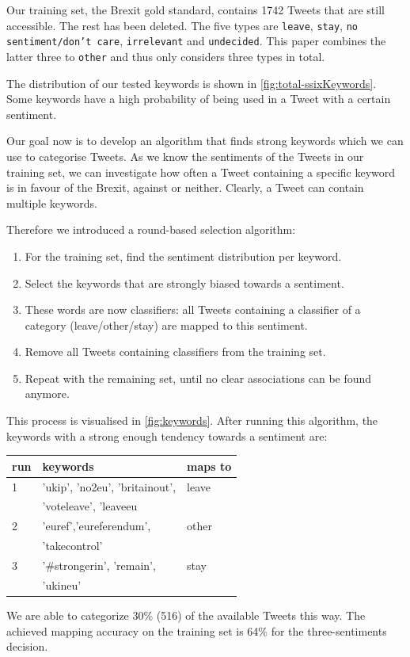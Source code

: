 \documentclass{emulateapj}
\begin{document}
Our training set, the Brexit gold standard, contains 1742 Tweets that are still accessible. 
The rest has been deleted.
The five types are \texttt{leave}, \texttt{stay}, \texttt{no sentiment/don't care}, \texttt{irrelevant} and \texttt{undecided}. 
This paper combines the latter three to \texttt{other} and thus only considers three types in total.

The distribution of our tested keywords is shown in \cref{fig:total-ssixKeywords}. 
Some keywords have a high probability of being used in a Tweet with a certain sentiment. 

Our goal now is to develop an algorithm that finds strong keywords which we can use to categorise Tweets.
As we know the sentiments of the Tweets in our training set, we can investigate how often a Tweet containing a specific keyword is in favour of the Brexit, against or neither.
Clearly, a Tweet can contain multiple keywords. 

Therefore we introduced a round-based selection algorithm:
\begin{enumerate}
  \item For the training set, find the sentiment distribution per keyword.
  \item Select the keywords that are strongly biased towards a sentiment.
  \item These words are now classifiers: all Tweets containing a classifier of a category (leave/other/stay) are mapped to this sentiment.
  \item Remove all Tweets containing classifiers from the training set.
  \item Repeat with the remaining set, until no clear associations can be found anymore.
\end{enumerate}
This process is visualised in \cref{fig:keywords}.
After running this algorithm, the keywords with a strong enough tendency towards a sentiment are:
\newline\newline
{\ttfamily
  \begin{tabular}{|l|l|l|}
    \hline 
    run & keywords & maps to \\ \hline \hline
    1 & 'ukip', 'no2eu', 'britainout', & leave \\ 
	  & 'voteleave', 'leaveeu & \\ \hline
    2 & 'euref','eureferendum', & other\\
	  & 'takecontrol' & \\ \hline
    3 & '\#strongerin', 'remain', & stay \\
    & 'ukineu' & \\ \hline
  \end{tabular}
}
\newline\newline
We are able to categorize 30\% (516) of the available Tweets this way. 
The achieved mapping accuracy on the training set is 64\% for the three-sentiments decision.
\end{document}
